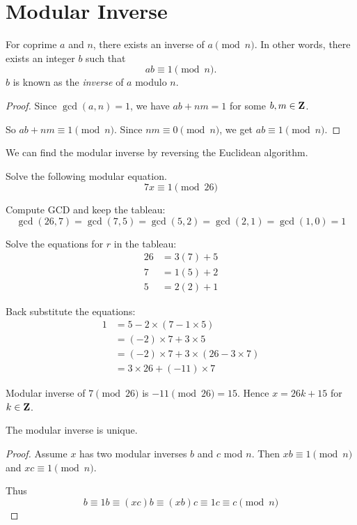 \section{Modular Inverse}
For coprime $a$ and $n$, there exists an inverse of $a \pmod n$. In other words, there exists an integer $b$ such that 
\[ab \equiv 1 \pmod n.\]
$b$ is known as the \emph{inverse} of $a$ modulo $n$.

\begin{proof}
Since $\gcd(a,n)=1$, we have $ab+nm=1$ for some $b,m\in\mathbf Z$.

So $ab+nm \equiv 1 \pmod n$. Since $nm \equiv 0 \pmod n$, we get $ab \equiv 1 \pmod n$.
\end{proof}

We can find the modular inverse by reversing the Euclidean algorithm.

\begin{exercise}
Solve the following modular equation.
\[7x \equiv 1 \pmod {26}\]
\end{exercise}
\begin{solution}
Compute GCD and keep the tableau:
\[\gcd(26,7) = \gcd(7,5) = \gcd(5,2) = \gcd(2,1) = \gcd(1,0) = 1\]

Solve the equations for $r$ in the tableau:
\begin{align*}
26 &= 3(7) + 5 \\
7 &= 1(5) + 2 \\
5 &= 2(2) + 1
\end{align*}

Back substitute the equations:
\begin{align*}
1 &= 5 - 2 \times (7 - 1 \times 5) \\
&= (-2) \times 7 + 3 \times 5 \\
&= (-2) \times 7 + 3 \times (26 - 3 \times 7) \\
&= 3 \times 26 + (-11) \times 7
\end{align*}

Modular inverse of $7 \pmod {26}$ is $-11 \pmod {26} = 15$. Hence $x = 26k + 15$ for $k\in\mathbf Z$.
\end{solution}

\begin{lemma}
The modular inverse is unique.
\end{lemma}

\begin{proof}
Assume $x$ has two modular inverses $b$ and $c$ mod $n$. Then $xb\equiv1\pmod n$ and $xc\equiv1\pmod n$.

Thus
\[b\equiv1b\equiv(xc)b\equiv(xb)c\equiv1c\equiv c\pmod n\]
\end{proof}

